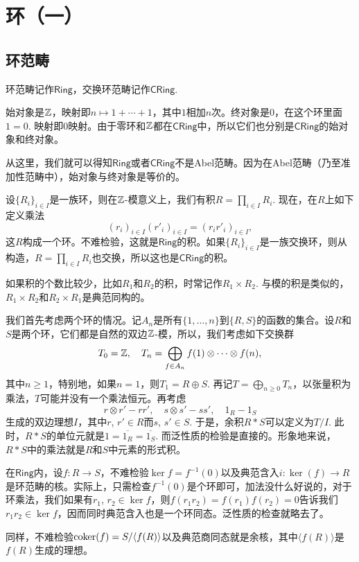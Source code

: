 \chapter{环（一）}

\section{环范畴}

环范畴记作$\mathsf{Ring}$，交换环范畴记作$\mathsf{CRing}$. 

\begin{para}[始对象与终对象]
始对象是$\mathbb{Z}$，映射即$n\mapsto 1+\cdots+1$，其中$1$相加$n$次。终对象是$0$，在这个环里面$1=0$. 映射即$0$映射。由于零环和$\mathbb{Z}$都在$\mathsf{CRing}$中，所以它们也分别是$\mathsf{CRing}$的始对象和终对象。
\end{para}

从这里，我们就可以得知$\mathsf{Ring}$或者$\mathsf{CRing}$不是Abel范畴。因为在Abel范畴（乃至准加性范畴中），始对象与终对象是等价的。

\begin{para}[积]
设$\{R_i\}_{i\in I}$是一族环，则在$\mathbb{Z}$-模意义上，我们有积$R=\prod_{i\in I}R_i$. 现在，在$R$上如下定义乘法
\[
	(r_i)_{i\in I}(r'_i)_{i\in I}=(r_ir'_i)_{i\in I},
\]
这$R$构成一个环。不难检验，这就是$\mathsf{Ring}$的积。如果$\{R_i\}_{i\in I}$是一族交换环，则从构造，$R=\prod_{i\in I}R_i$也交换，所以这也是$\mathsf{CRing}$的积。
\end{para}

如果积的个数比较少，比如$R_1$和$R_2$的积，时常记作$R_1\times R_2$. 与模的积是类似的，$R_1\times R_2$和$R_2\times R_1$是典范同构的。

\begin{para}[余积]
我们首先考虑两个环的情况。记$A_n$是所有$\{1,\dots,n\}$到$\{R,S\}$的函数的集合。设$R$和$S$是两个环，它们都是自然的双边$\mathbb{Z}$-模，所以，我们考虑如下交换群
\[
	T_0=\mathbb{Z},\quad T_n=\bigoplus_{f\in A_n}f(1)\otimes \cdots \otimes f(n),
\]
其中$n\geq 1$，特别地，如果$n=1$，则$T_1=R\oplus S$. 再记$T=\bigoplus_{n\geq 0} T_n$，以张量积为乘法，$T$可能并没有一个乘法恒元。再考虑
\[
	r\otimes r'-rr',\quad s\otimes s'-ss',\quad 1_R-1_S
\]
生成的双边理想$I$，其中$r$, $r'\in R$而$s$, $s'\in S$. 于是，余积$R*S$可以定义为$T/I$. 此时，$R*S$的单位元就是$1=\overline{1_R}=\overline{1_S}$. 而泛性质的检验是直接的。形象地来说，$R*S$中的乘法就是$R$和$S$中元素的形式积。
\end{para}


\begin{para}[核与余核]
在$\mathsf{Ring}$内，设$f:R\to S$，不难检验$\ker f=f^{-1}(0)$以及典范含入$i:\ker(f)\to R$是环范畴的核。实际上，只需检查$f^{-1}(0)$是个环即可，加法没什么好说的，对于环乘法，我们如果有$r_1$, $r_2\in \ker f$，则$f(r_1r_2)=f(r_1)f(r_2)=0$告诉我们$r_1r_2\in \ker f$，因而同时典范含入也是一个环同态。泛性质的检查就略去了。

同样，不难检验$\operatorname{coker}(f)=S/\langle f(R)\rangle$以及典范商同态就是余核，其中$\langle f(R)\rangle$是$f(R)$生成的理想。
\end{para}

